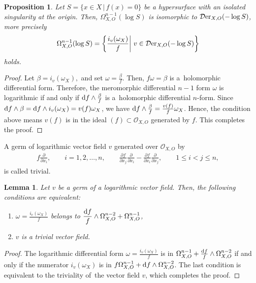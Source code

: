 \documentclass[pdftex]{sigma}%
\numberwithin{equation}{section}
\newtheorem{Lemma}[Theorem]{Lemma}
\newtheorem{Proposition}[Theorem]{Proposition}
 { \theoremstyle{definition}
\newtheorem{Definition}[Theorem]{Definition}
\newtheorem{Remark}[Theorem]{Remark}
\newtheorem{Example}[Theorem]{Example}
 }
\begin{document}
\begin{Proposition}
Let $S=\{x \in X \,|\, f(x) =0\}$ be a hypersurface with an isolated singularity at the origin. Then, $\Omega_{X, O}^{n-1}(\log S)$ is isomorphic to
${\mathcal D}{\rm er}_{X, O}(-\log S)$, more precisely
\begin{gather*}
\Omega_{X, O}^{n-1}(\log S) = \left\{ \frac{i_{v}(\omega_X)}{f} \middle| \ v \in {\mathcal D}{\rm er}_{X, O}(-\log S) \right\}
\end{gather*}
holds.
\end{Proposition}
\begin{proof}
Let $\beta=i_{v}(\omega_X), $ and set $ \omega = \frac{\beta}{f}$. Then, $f\omega = \beta$ is a~holomorphic differential form. Therefore, the meromorphic differential $n-1$ form
$\omega$ is logarithmic if and only if ${\rm d}f\wedge \frac{\beta}{f}$ is a~holo\-morphic differential $n$-form. Since ${\rm d}f\wedge \beta = {\rm d}f\wedge i_{v}(\omega_X) = v(f)\omega_X$, we have ${\rm d}f\wedge \frac{\beta}{f} = \frac{v(f)}{f} \omega_X$. Hence, the condition above means $v(f)$ is in the ideal $(f) \subset {\mathcal O}_{X,O}$ generated by $f$.
This completes the proof.
\end{proof}



A germ of logarithmic vector field $v$ generated over ${\mathcal O}_{X,O}$ by
\begin{gather*}
f\frac{\partial}{\partial x_i}, \qquad
i=1,2,\ldots,n, \qquad
\frac{\partial f}{\partial x_j}\frac{\partial}{\partial x_i} - \frac{\partial f}{\partial x_i}\frac{\partial}{\partial x_j}, \qquad
1 \leq i < j \leq n,
\end{gather*}
is called trivial.

\begin{Lemma}
Let $v$ be a germ of a logarithmic vector field. Then, the following conditions are equivalent:
\begin{enumerate}\itemsep=0pt
\item[$(i)$] $\displaystyle \omega = \frac{i_{v}(\omega_X)}{f}$ belongs to $\displaystyle\frac{{\rm d}f}{f} \wedge \Omega_{X,O}^{n-2}+ \Omega_{X,O}^{n-1}$,
\item[$(ii)$] $v$ is a trivial vector field.
\end{enumerate}
\end{Lemma}
\begin{proof}
The logarithmic differential form $\omega = \frac{i_{v}(\omega_X)}{f}$ is in $\Omega_{X,O}^{n-1}+\frac{{\rm d}f}{f} \wedge \Omega_{X,O}^{n-2}$ if and only if the numerator
$i_{v}(\omega_X)$ is in $f\Omega_{X,O}^{n-1}+ {\rm d}f\wedge \Omega_{X,O}^{n-2}$. The last condition is
equivalent to the triviality of~the vector field $v$, which completes the proof.
\end{proof}
\end{document}
